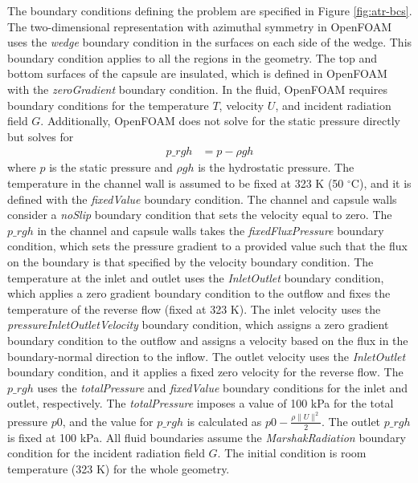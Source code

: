 The boundary conditions defining the problem are specified in Figure \ref{fig:atr-bcs}.
The two-dimensional representation with azimuthal symmetry in OpenFOAM uses the \textit{wedge} boundary condition in the surfaces on each side of the wedge.
This boundary condition applies to all the regions in the geometry.
The top and bottom surfaces of the capsule are insulated, which is defined in OpenFOAM with the \textit{zeroGradient} boundary condition.
In the fluid, OpenFOAM requires boundary conditions for the temperature $T$, velocity $U$, and incident radiation field $G$.
Additionally, OpenFOAM does not solve for the static pressure directly but solves for
\begin{align}
p\_rgh &= p - \rho g h
\end{align}
where $p$ is the static pressure and $\rho g h$ is the hydrostatic pressure.
The temperature in the channel wall is assumed to be fixed at 323 K (50 $^\circ$C), and it is defined with the \textit{fixedValue} boundary condition.
The channel and capsule walls consider a \textit{noSlip} boundary condition that sets the velocity equal to zero.
The $p\_rgh$ in the channel and capsule walls takes the \textit{fixedFluxPressure} boundary condition, which sets the pressure gradient to a provided value such that the flux on the boundary is that specified by the velocity boundary condition.
The temperature at the inlet and outlet uses the \textit{InletOutlet} boundary condition, which applies a zero gradient boundary condition to the outflow and fixes the temperature of the reverse flow (fixed at 323 K).
The inlet velocity uses the \textit{pressureInletOutletVelocity} boundary condition, which assigns a zero gradient boundary condition to the outflow and assigns a velocity based on the flux in the boundary-normal direction to the inflow.
The outlet velocity uses the \textit{InletOutlet} boundary condition, and it applies a fixed zero velocity for the reverse flow.
The $p\_rgh$ uses the \textit{totalPressure} and \textit{fixedValue} boundary conditions for the inlet and outlet, respectively.
The \textit{totalPressure} imposes a value of 100 kPa for the total pressure $p0$, and the value for $p\_rgh$ is calculated as $p0 - \frac{\rho \|U\|^2}{2}$.
The outlet $p\_rgh$ is fixed at 100 kPa.
All fluid boundaries assume the \textit{MarshakRadiation} boundary condition for the incident radiation field $G$.
The initial condition is room temperature (323 K) for the whole geometry.

